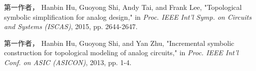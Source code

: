 
\begin{publications}{99}
	\item 
\ifsjtu@review\relax
第一作者，
\else 
Hanbin Hu, Guoyong Shi, Andy Tai, and Frank Lee,
\fi 
"Topological symbolic simplification for analog design," in \textit{Proc. IEEE Int'l Symp. on Circuits and Systems (ISCAS)}, 2015, pp. 2644-2647.
    \item 
\ifsjtu@review\relax
第一作者，
\else 
Hanbin Hu, Guoyong Shi, and Yan Zhu,
\fi 
"Incremental symbolic construction for topological modeling of analog circuits," in \textit{Proc. IEEE Int'l Conf. on ASIC (ASICON)}, 2013, pp. 1-4.
\end{publications}
